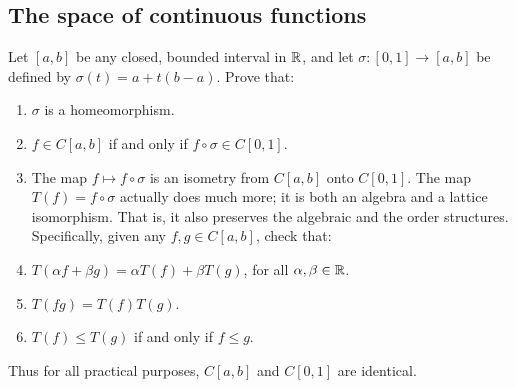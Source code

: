 \subsection{The space of continuous functions}


\begin{exercise}{63}
Let $[a,b]$ be any closed, bounded interval in $\mathbb{R}$, and let $\sigma:[0,1]\to[a,b]$ be defined by $\sigma(t)= a + t(b-a)$.
Prove that:
\begin{enumerate}
    \item $\sigma$ is a homeomorphism.
    \item $f\in C[a,b]$ if and only if $f\circ \sigma\in C[0,1]$.
    \item The map $f\mapsto f \circ \sigma$ is an isometry from $C[a,b]$ onto $C[0,1]$.
    The map $T(f) = f \circ \sigma$ actually does much more;
    it is both an algebra and a lattice isomorphism.
    That is, it also preserves the algebraic and the order structures.
    Specifically, given any $f,g\in C[a,b]$, check that:
    \item $T(\alpha f + \beta g) = \alpha T(f) + \beta T(g)$, for all $\alpha,\beta\in\mathbb{R}$.
    \item $T(fg)=T(f)T(g)$.
    \item $T(f) \leq T(g)$ if and only if $f\leq g$.
\end{enumerate}
Thus for all practical purposes, $C[a,b]$ and $C[0,1]$ are identical.
\end{exercise}
